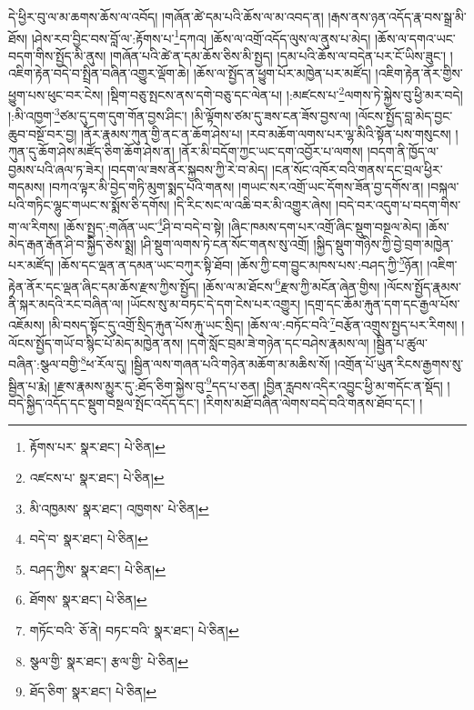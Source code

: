 དེ་ཕྱིར་བུ་ལ་མ་ཆགས་ཆོས་ལ་འབོད། །གཞོན་ཚེ་དམ་པའི་ཆོས་ལ་མ་འབད་ན། །རྒས་ནས་ཉན་འདོད་རྣ་བས་སྒྲ་མི་ཐོས། །ཤེས་རབ་བྱིང་བས་བློ་ལ་:རྟོགས་པ་\footnote{རྟོགས་པར་  སྣར་ཐང་།  པེ་ཅིན། }དཀའ། །ཆོས་ལ་འགྲོ་འདོད་ལུས་ལ་ནུས་པ་མེད། །ཆོས་ལ་དགའ་ཡང་བདག་གིས་སྤྱོད་མི་ནུས། །གཞོན་པའི་ཚེ་ན་དམ་ཆོས་ཅིས་མི་སྤྱད། །དམ་པའི་ཆོས་ལ་བདེན་པར་ངོ་ཡིས་ཟུང་། །འཇིག་རྟེན་བདེ་བ་སྤྲིན་བཞིན་འགྱུར་ལྡོག་ཆེ། །ཆོས་ལ་སྤྱོད་ན་ཕྱུག་པོར་མཁྱེན་པར་མཛོད། །འཇིག་རྟེན་ནོར་གྱིས་ཕྱུག་པས་ཕུང་བར་ངེས། །སྡིག་བཅུ་སྤངས་ནས་དགེ་བཅུ་དང་ལེན་པ། །:མཛངས་པ་\footnote{འཛངས་པ་  སྣར་ཐང་།  པེ་ཅིན། }ལགས་ཏེ་སྐྱེས་བུ་ཕྱི་མར་བདེ། །:མི་འཁྱག་\footnote{མི་འཁྱམས་  སྣར་ཐང་། འཁྱགས་  པེ་ཅིན། }ཙམ་དུ་དག་དུག་གོན་བྱས་ཤིང་། །མི་ལྟོགས་ཙམ་དུ་ཟས་ངན་ཟོས་བྱས་ལ། །ལོངས་སྤྱོད་བླ་མེད་བྱང་ཆུབ་བསྔོ་བར་བྱ། །ནོར་རྣམས་ཀུན་གྱི་ནང་ན་ཆོག་ཤེས་པ། །རབ་མཆོག་ལགས་པར་ལྷ་མིའི་སྟོན་པས་གསུངས། །ཀུན་དུ་ཆོག་ཤེས་མཛོད་ཅིག་ཆོག་ཤེས་ན། །ནོར་མི་བདོག་ཀྱང་ཡང་དག་འབྱོར་པ་ལགས། །བདག་ནི་ཁྱོད་ལ་བྱམས་པའི་ཞལ་ཏ་ཟེར། །བདག་ལ་ཟས་ནོར་སྐྱབས་ཀྱི་རེ་བ་མེད། །ངན་སོང་འཁོར་བའི་གནས་དང་བྲལ་ཕྱིར་གདམས། །བཀའ་ལྟར་མི་བྱེད་གཏི་མུག་སྨད་པའི་གནས། །གཡང་སར་འགྲོ་ཡང་དོགས་ཟོན་བྱ་དགོས་ན། །བསྐལ་པའི་གཏིང་ལྷུང་གཡང་ས་སྨོས་ཅི་དགོས། །དི་རིང་སང་ལ་འཆི་བར་མི་འགྱུར་ཞེས། །བདེ་བར་འདུག་པ་བདག་གིས་ག་ལ་རིགས། །ཆོས་སྤྱད་:གཞོན་ཡང་\footnote{བདེ་བ་  སྣར་ཐང་།  པེ་ཅིན། }ཤི་བ་བདེ་བ་སྟེ། །ཞིང་ཁམས་དག་པར་འགྲོ་ཞིང་སྡུག་བསྔལ་མེད། །ཆོས་མེད་རྒན་རྒོན་ཤི་བ་སྐྱིད་ཅེས་སྨྲ། །ཤི་སྡུག་ལགས་ཏེ་ངན་སོང་གནས་སུ་འགྲོ། །སྐྱིད་སྡུག་གཉིས་ཀྱི་བྱེ་བྲག་མཁྱེན་པར་མཛོད། །ཆོས་དང་ལྡན་ན་དམན་ཡང་བཀུར་སྟི་ཐོབ། །ཆོས་ཀྱི་ངག་བྱུང་མཁས་པས་:བཤད་ཀྱི་\footnote{བཤད་ཀྱིས་  སྣར་ཐང་།  པེ་ཅིན། }ཉོན། །འཇིག་རྟེན་ནོར་དང་ལྡན་ཞིང་དམ་ཆོས་རྫས་ཀྱིས་སྤྱོད། །ཆོས་ལ་མ་ཐོངས་\footnote{ཐོགས་  སྣར་ཐང་།  པེ་ཅིན། }རྫས་ཀྱི་མངོན་ཞེན་གྱིས། །ལོངས་སྤྱོད་རྣམས་ནི་སྐར་མདའི་རང་བཞིན་ལ། །ཡོངས་སུ་མ་བཏང་དེ་དག་ངེས་པར་འགྱུར། །དགྲ་དང་ཆོམ་རྐུན་དག་དང་རྒྱལ་པོས་འཇོམས། །མི་བསད་སྟོང་དུ་འགྲོ་སྲིད་རྐུན་པོས་རྐུ་ཡང་སྲིད། །ཆོས་ལ་:བཏོང་བའི་\footnote{གཏོང་བའི་  ཅོ་ནེ། བཏང་བའི་  སྣར་ཐང་།  པེ་ཅིན། }བརྩོན་འགྲུས་སྤྱད་པར་རིགས། །ལོངས་སྤྱོད་གཡོ་བ་སྙིང་པོ་མེད་མཁྱེན་ནས། །དགེ་སློང་བྲམ་ཟེ་གཉེན་དང་བཤེས་རྣམས་ལ། །སྦྱིན་པ་ཚུལ་བཞིན་:སྩལ་བགྱི་\footnote{སྩལ་གྱི་  སྣར་ཐང་། རྩལ་གྱི་  པེ་ཅིན། }ཕ་རོལ་དུ། །སྦྱིན་ལས་གཞན་པའི་གཉེན་མཆོག་མ་མཆིས་སོ། །འགྲོན་པོ་ཡུན་རིངས་རྒྱགས་སུ་སྦྱིན་པ་རྨེ། །རྫས་རྣམས་མྱུར་དུ་:ཐོད་ཅིག་སྐྱེས་བུ་\footnote{ཐོད་ཅིག་  སྣར་ཐང་།  པེ་ཅིན། }དད་པ་ཅན། །བྱིན་རླབས་འདིར་འབྱུང་ཕྱི་མ་གདོང་ན་སྡོད། །བདེ་སྐྱིད་འདོད་དང་སྡུག་བསྔལ་སྤོང་འདོད་དང་། །རིགས་མཐོ་བཞིན་ལེགས་བདེ་བའི་གནས་ཐོབ་དང་། །
